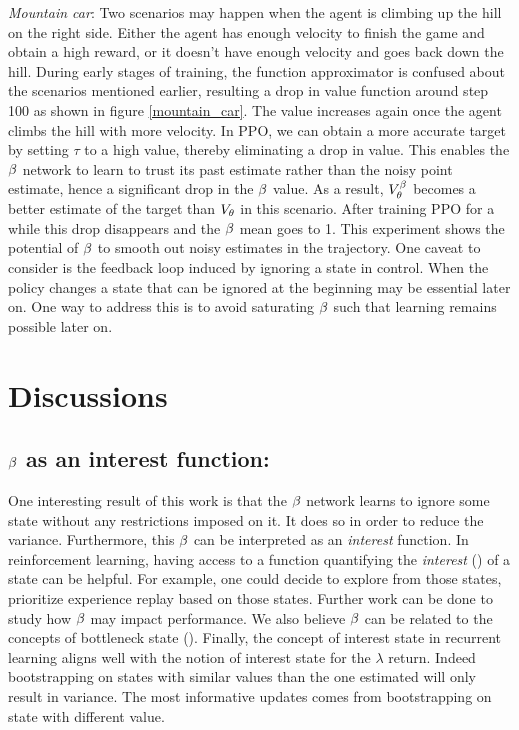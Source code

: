 \emph{Mountain car}: Two scenarios may happen when the agent is climbing up the hill on the right side. Either the agent has enough velocity to finish the game and obtain a high reward, or it doesn't have enough velocity and goes back down the hill. During early stages of training, the function approximator is confused about the scenarios mentioned earlier, resulting a drop in value function around step 100 as shown in figure \ref{mountain_car}. The value increases again once the agent climbs the hill with more velocity. In PPO, we can obtain a more accurate target by setting $\tau$ to a high value, thereby eliminating a drop in value. This enables the $\beta$ network to learn to trust its past estimate rather than the noisy point estimate, hence a significant drop in the $\beta$ value. As a result, $V^{\beta}_{\theta}$ becomes a  better estimate of the target than $V_{\theta}$ in this scenario. After training PPO for a while this drop disappears and the $\beta$ mean goes to 1. This experiment shows the potential of $\beta$ to smooth out noisy estimates in the trajectory. One caveat to consider is the feedback loop induced by ignoring a state in control. When the policy changes a state that can be ignored at the beginning may be essential later on. One way to address this is to avoid saturating $\beta$ such that learning remains possible later on.


\section{Discussions}
\subsection{$\beta$ as an interest function:} One interesting result of this work is that the $\beta$ network learns to ignore some state without any restrictions imposed on it. It does so in order to reduce the variance. Furthermore, this $\beta$ can be interpreted as an \emph{interest} function. In reinforcement learning, having access to a function quantifying the \emph{interest} (\cite{mahmood2015emphatic}) of a state can be helpful. For example, one could decide to explore from those states, prioritize experience replay based on those states. Further work can be done to study how $\beta$ may impact performance. We also believe $\beta$ can be related to the concepts of bottleneck state (\cite{tishby2011information}). Finally, the concept of interest state in recurrent learning aligns well with the notion of interest state for the $\lambda$ return. Indeed bootstrapping on states with similar values than the one estimated will only result in variance. The most informative updates comes from bootstrapping on state with different value. 

